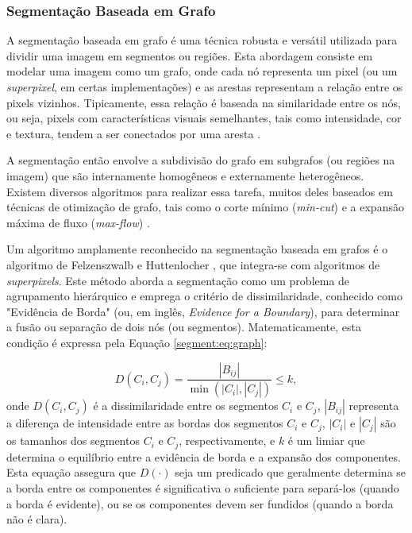\subsubsection{Segmentação Baseada em Grafo}
\label{segment:graph}
A segmentação baseada em grafo é uma técnica robusta e versátil utilizada para dividir uma imagem em segmentos ou regiões. Esta abordagem consiste em modelar uma imagem como um grafo, onde cada nó representa um pixel (ou um \textit{superpixel}, em certas implementações) e as arestas representam a relação entre os pixels vizinhos. Tipicamente, essa relação é baseada na similaridade entre os nós, ou seja, pixels com características visuais semelhantes, tais como intensidade, cor e textura, tendem a ser conectados por uma aresta \citep{Felzenszwalb2004EfficientSegmentation}.

A segmentação então envolve a subdivisão do grafo em subgrafos (ou regiões na imagem) que são internamente homogêneos e externamente heterogêneos. Existem diversos algoritmos para realizar essa tarefa, muitos deles baseados em técnicas de otimização de grafo, tais como o corte mínimo (\textit{min-cut}) e a expansão máxima de fluxo (\textit{max-flow}) \citep{Boykov2001FastCuts}.

Um algoritmo amplamente reconhecido na segmentação baseada em grafos é o algoritmo de Felzenszwalb e Huttenlocher \citep{Felzenszwalb2004EfficientSegmentation}, que integra-se com algoritmos de \textit{superpixels}. Este método aborda a segmentação como um problema de agrupamento hierárquico e emprega o critério de dissimilaridade, conhecido como "Evidência de Borda" (ou, em inglês, \textit{Evidence for a Boundary}), para determinar a fusão ou separação de dois nós (ou segmentos). Matematicamente, esta condição é expressa pela Equação \ref{segment:eq:graph}:

\begin{equation}
    \label{segment:eq:graph}
    D(C_i, C_j) = \frac{|B_{ij}|}{\min(|C_i|,|C_j|)} \leq k,
\end{equation}
onde $D(C_i, C_j)$ é a dissimilaridade entre os segmentos $C_i$ e $C_j$, $|B_{ij}|$ representa a diferença de intensidade entre as bordas dos segmentos $C_i$ e $C_j$, $|C_i|$ e $|C_j|$ são os tamanhos dos segmentos $C_i$ e $C_j$, respectivamente, e $k$ é um limiar que determina o equilíbrio entre a evidência de borda e a expansão dos componentes. Esta equação assegura que $D(\cdot)$ seja um predicado que geralmente determina se a borda entre os componentes é significativa o suficiente para separá-los (quando a borda é evidente), ou se os componentes devem ser fundidos (quando a borda não é clara).

